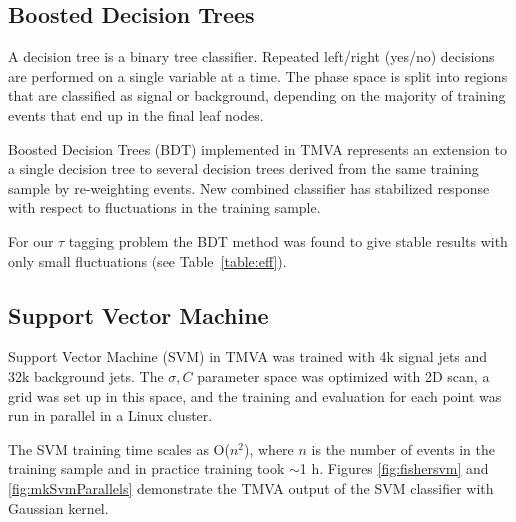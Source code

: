 \documentclass[a4paper]{jpconf}
\begin{document}




\subsection{Boosted Decision Trees}

A decision tree is a binary tree classifier. 
Repeated left/right (yes/no) decisions are performed on a single variable at a time.
The phase space is split into regions that are classified as signal or
background, depending on the majority of training events that end up in the final leaf nodes.

Boosted Decision Trees (BDT) implemented in TMVA 
represents an extension to a single decision tree to several decision trees
derived from the same training sample by re-weighting events.
New combined classifier has stabilized response with respect to fluctuations in the training sample.

For our $\tau$ tagging problem the BDT method was found to give stable results 
with only small fluctuations (see Table~\ref{table:eff}).

\subsection{Support Vector Machine}
Support Vector Machine (SVM) in TMVA
was trained with 4k signal jets and 32k background jets.
The $\sigma, C$ parameter space
was optimized with 2D scan,  
a grid was set up in this space, and 
the training and evaluation for each point was run in parallel in a Linux cluster.

The SVM training time scales as O($n^2$), where $n$ is the number of events in the training sample  
and in practice training took $\sim$1 h. 
Figures 
\ref{fig:fishersvm}
 and \ref{fig:mkSvmParallels} demonstrate the TMVA output of the SVM classifier
with Gaussian kernel.
\end{document}
